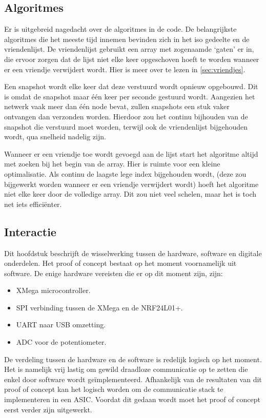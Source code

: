 \subsection{Algoritmes}

Er is uitgebreid nagedacht over de algoritmes in de code. De belangrijkste algoritmes die het meeste tijd innemen bevinden zich in het iso gedeelte en de vriendenlijst. De vriendenlijst gebruikt een array met zogenaamde `gaten' er in, die ervoor zorgen dat de lijst niet elke keer opgeschoven hoeft te worden wanneer er een vriendje verwijdert wordt. Hier is meer over te lezen in \autoref{sec:vriendjes}.

Een snapshot wordt elke keer dat deze verstuurd wordt opnieuw opgebouwd. Dit is omdat de snapshot maar één keer per seconde gestuurd wordt. Aangezien het netwerk vaak meer dan één node bevat, zullen snapshots een stuk vaker ontvangen dan verzonden worden. Hierdoor zou het continu bijhouden van de snapshot die verstuurd moet worden, terwijl ook de vriendenlijst bijgehouden wordt, qua snelheid nadelig zijn.

Wanneer er een vriendje toe wordt gevoegd aan de lijst start het algoritme altijd met zoeken bij het begin van de array. Hier is ruimte voor een kleine optimalisatie. Als continu de laagste lege index bijgehouden wordt, (deze zou bijgewerkt worden wanneer er een vriendje verwijdert wordt) hoeft het algoritme niet elke keer door de volledige array. Dit zou niet veel schelen, maar het is toch net iets efficiënter.


\subsection{Interactie}
Dit hoofdstuk beschrijft de wisselwerking tussen de hardware, software en digitale onderdelen. Het proof of concept bestaat op het moment voornamelijk uit software. De enige hardware vereisten die er op dit moment zijn, zijn:
\begin{itemize}
    \item XMega microcontroller.
    \item SPI verbinding tussen de XMega en de NRF24L01+.
    \item UART naar USB omzetting.
    \item ADC voor de potentiometer.
\end{itemize}
De verdeling tussen de hardware en de software is redelijk logisch op het moment. Het is namelijk vrij lastig om gewild draadloze communicatie op te zetten die enkel door software wordt geïmplementeerd. Afhankelijk van de resultaten van dit proof of concept kan het logisch worden om de communicatie stack te implementeren in een ASIC. Voordat dit gedaan wordt moet het proof of concept eerst verder zijn uitgewerkt.

